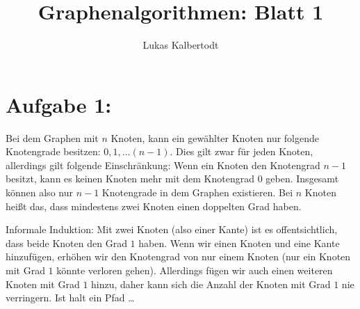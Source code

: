 \documentclass[11pt]{scrartcl}  %
\title{Graphenalgorithmen: Blatt 1}
\author{Lukas Kalbertodt}
\newcommand{\subtbegin}{\begin{compactenum}[(a)]}
\newcommand{\subtend}{\end{compactenum}}
\begin{document}
\maketitle


\section*{Aufgabe 1:}

\subtbegin
  \item Bei dem Graphen mit $n$ Knoten, kann ein gewählter Knoten nur folgende Knotengrade besitzen: $0, 1, \dots (n-1)$. Dies gilt zwar für jeden Knoten, allerdings gilt folgende Einschränkung: Wenn ein Knoten den Knotengrad $n-1$ besitzt, kann es keinen Knoten mehr mit dem Knotengrad $0$ geben. Insgesamt können also nur $n-1$ Knotengrade in dem Graphen existieren. Bei $n$ Knoten heißt das, dass mindestens zwei Knoten einen doppelten Grad haben.
  \item Informale Induktion: Mit zwei Knoten (also einer Kante) ist es offentsichtlich, dass beide Knoten den Grad $1$ haben. Wenn wir einen Knoten und eine Kante hinzufügen, erhöhen wir den Knotengrad von nur einem Knoten (nur ein Knoten mit Grad $1$ könnte verloren gehen). Allerdings fügen wir auch einen weiteren Knoten mit Grad $1$ hinzu, daher kann sich die Anzahl der Knoten mit Grad $1$ nie verringern. Ist halt ein Pfad \dots
\subtend
\end{document}

